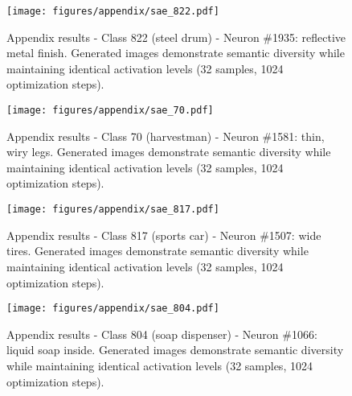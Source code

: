 \begin{figure}[p]
  \centering
  \texttt{[image: figures/appendix/sae\_822.pdf]}
  \caption{Appendix results - Class 822 (steel drum) - Neuron \#1935: reflective metal finish. Generated images demonstrate semantic diversity while maintaining identical activation levels (32 samples, 1024 optimization steps).}
  \label{fig:appendix_822}
\end{figure}

\begin{figure}[p]
  \centering
  \texttt{[image: figures/appendix/sae\_70.pdf]}
  \caption{Appendix results - Class 70 (harvestman) - Neuron \#1581: thin, wiry legs. Generated images demonstrate semantic diversity while maintaining identical activation levels (32 samples, 1024 optimization steps).}
  \label{fig:appendix_70}
\end{figure}

\begin{figure}[p]
  \centering
  \texttt{[image: figures/appendix/sae\_817.pdf]}
  \caption{Appendix results - Class 817 (sports car) - Neuron \#1507: wide tires. Generated images demonstrate semantic diversity while maintaining identical activation levels (32 samples, 1024 optimization steps).}
  \label{fig:appendix_817}
\end{figure}

\begin{figure}[p]
  \centering
  \texttt{[image: figures/appendix/sae\_804.pdf]}
  \caption{Appendix results - Class 804 (soap dispenser) - Neuron \#1066: liquid soap inside. Generated images demonstrate semantic diversity while maintaining identical activation levels (32 samples, 1024 optimization steps).}
  \label{fig:appendix_804}
\end{figure}

